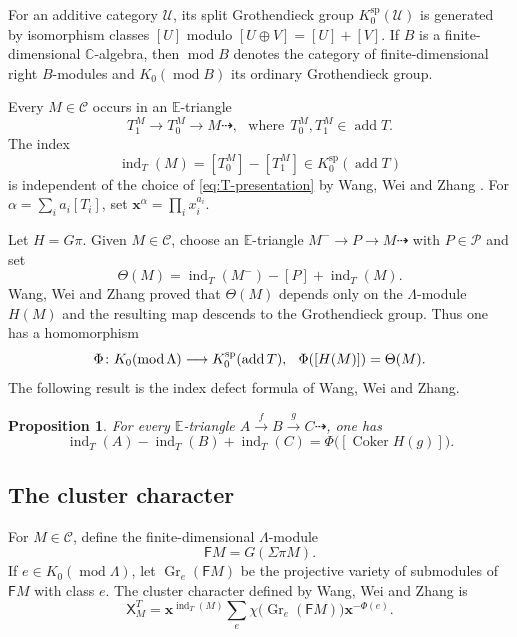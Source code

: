 \documentclass[11pt,reqno]{article}
\numberwithin{equation}{section}
\newtheorem{proposition}[proposition]{Proposition}
\theoremstyle{definition}
\DeclareMathOperator{\add}{add}
\DeclareMathOperator{\Coker}{Coker}
\DeclareMathOperator{\Gr}{Gr}
\DeclareMathOperator{\ind}{ind}
\DeclareMathOperator{\modu}{mod}
\newcommand{\C}{\mathcal C}
\newcommand{\Pcal}{\mathcal P}
\newcommand{\E}{\mathbb E}
\newcommand{\F}{\mathsf F}
\newcommand{\X}{\mathsf X}
\newcommand{\kk}{\mathbb C}
\newcommand{\Ksp}{K_0^{\mathrm{sp}}}
\newcommand{\xto}[1]{\xrightarrow{#1}}
\newcommand{\etri}{\dashrightarrow}
\newcommand{\bx}{\mathbf x}
\begin{document}
For an additive category $\mathcal U$, its split Grothendieck group
$K_0^{\mathrm{sp}}(\mathcal U)$ is generated by isomorphism classes $[U]$ modulo
$[U\oplus V]=[U]+[V]$.  If $B$ is a finite-dimensional $\kk$-algebra, then
$\modu B$ denotes the category of finite-dimensional right $B$-modules and
$K_0(\modu B)$ its ordinary Grothendieck group.

Every $M\in\C$ occurs in an $\E$-triangle
\begin{equation}\label{eq:T-presentation}
 T_1^M\longrightarrow T_0^M\longrightarrow M\etri,
~~~\mbox{where}~~T_0^M,T_1^M\in\add T.
\end{equation}
The index
\[
 \ind_T(M)=[T_0^M]-[T_1^M]\in\Ksp(\add T)
\]
is independent of the choice of \eqref{eq:T-presentation} by Wang, Wei and Zhang \cite{WangWeiZhangCC}.  For
$\alpha=\sum_i a_i[T_i]$, set $\bx^\alpha=\prod_i x_i^{a_i}$.

Let $H=G\pi$.  Given $M\in\C$, choose an $\E$-triangle
$M^-\to P\to M\etri$ with $P\in\Pcal$ and set
\[
 \Theta(M)=\ind_T(M^-)-[P]+\ind_T(M).
\]
Wang, Wei and Zhang \cite[Section~3, especially Theorem~3.9]{WangWeiZhangCC} proved that $\Theta(M)$ depends only on the $\Lambda$-module $H(M)$ and  the resulting map descends to the Grothendieck group.  Thus one has a homomorphism
\[
 \Phi\colon K_0(\modu\Lambda)\longrightarrow\Ksp(\add T),
\hspace{2.5mm}
 \Phi([H(M)])=\Theta(M).
\]
The following result is the index defect formula of
Wang, Wei and Zhang.

\begin{proposition}{\rm \cite[Proposition~3.7]{WangWeiZhangCC}}\label{prop:index-defect}
For every $\E$-triangle $A\xto{f}B\xto{g}C\etri$, one has
\[
  \ind_T(A)-\ind_T(B)+\ind_T(C)
  =\Phi\bigl([\Coker H(g)]\bigr).
\]
\end{proposition}


\subsection{The cluster character}

For $M\in\C$, define the finite-dimensional $\Lambda$-module
\[
 \F M=G(\Sigma\pi M).
\]
If $e\in K_0(\modu\Lambda)$, let $\Gr_e(\F M)$ be the projective variety of submodules of $\F M$ with class $e$.  The cluster character defined by Wang, Wei and Zhang \cite{WangWeiZhangCC} is
\begin{equation}\label{eq:character}
 \X^T_M
 =\bx^{\ind_T(M)}
   \sum_e\chi\bigl(\Gr_e(\F M)\bigr)\bx^{-\Phi(e)}.
\end{equation}
\end{document}
